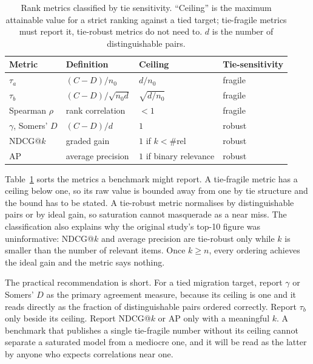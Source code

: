 \documentclass[journal,10pt]{IEEEtran}
\newcommand{\tb}{\tau_b}
\newcommand{\distinct}{d}
\newcommand{\nzero}{n_0}
\begin{document}
\begin{table}[t]
\centering
\caption{Rank metrics classified by tie sensitivity. ``Ceiling'' is the maximum attainable value
for a strict ranking against a tied target; tie-fragile metrics must report it, tie-robust metrics
do not need to. $\distinct$ is the number of distinguishable pairs.}
\label{tab:taxonomy}
\footnotesize
\begin{tabular}{@{}>{\raggedright\arraybackslash}p{1.5cm}>{\raggedright\arraybackslash}p{2.3cm}>{\raggedright\arraybackslash}p{2.2cm}>{\raggedright\arraybackslash}p{1.5cm}@{}}
\toprule
Metric & Definition & Ceiling & Tie-sensitivity \\
\midrule
$\tau_a$ & $(C-D)/\nzero$ & $\distinct/\nzero$ & fragile \\
$\tb$ & $(C-D)/\sqrt{\nzero\distinct}$ & $\sqrt{\distinct/\nzero}$ & fragile \\
Spearman $\rho$ & rank correlation & $<1$ & fragile \\
$\gamma$, Somers' $D$ & $(C-D)/\distinct$ & $1$ & robust \\
NDCG@$k$ & graded gain & $1$ if $k<\#\text{rel}$ & robust \\
AP & average precision & $1$ if binary relevance & robust \\
\bottomrule
\end{tabular}
\end{table}

Table~\ref{tab:taxonomy} sorts the metrics a benchmark might report. A tie-fragile metric has a
ceiling below one, so its raw value is bounded away from one by tie structure and the bound has to
be stated. A tie-robust metric normalises by distinguishable pairs or by ideal gain, so saturation
cannot masquerade as a near miss. The classification also explains why the original study's top-10
figure was uninformative: NDCG@$k$ and average precision are tie-robust only while $k$ is smaller
than the number of relevant items. Once $k\ge n$, every ordering achieves the ideal gain and the
metric says nothing.

The practical recommendation is short. For a tied migration target, report $\gamma$ or Somers' $D$
as the primary agreement measure, because its ceiling is one and it reads directly as the fraction
of distinguishable pairs ordered correctly. Report $\tb$ only beside its ceiling. Report NDCG@$k$
or AP only with a meaningful $k$. A benchmark that publishes a single tie-fragile number without
its ceiling cannot separate a saturated model from a mediocre one, and it will be read as the
latter by anyone who expects correlations near one.
\end{document}
